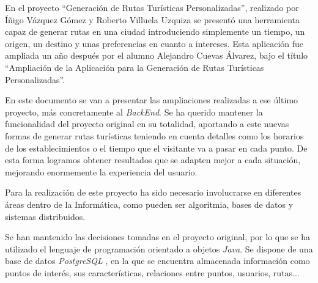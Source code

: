 
En el proyecto ``Generación de Rutas Turísticas Personalizadas'', realizado por Íñigo Vázquez Gómez y Roberto Villuela Uzquiza \cite{grpV1} se presentó una herramienta capaz de generar rutas en una ciudad introduciendo simplemente un tiempo, un origen, un destino y unas preferencias en cuanto a intereses.
Esta aplicación fue ampliada un año después por el alumno Alejandro Cuevas Álvarez, bajo el título ``Ampliación de la Aplicación para la Generación de Rutas Turísticas Personalizadas''\cite{grpV2}.

En este documento se van a presentar las ampliaciones realizadas a ese último proyecto, más concretamente al \textit{BackEnd}. Se ha querido mantener la funcionalidad del proyecto original en su totalidad, aportando a este nuevas formas de generar rutas turísticas teniendo en cuenta detalles como los horarios de los establecimientos o el tiempo que el visitante va a pasar en cada punto. De esta forma logramos obtener resultados que se adapten mejor a cada situación, mejorando enormemente la experiencia del usuario.

Para la realización de este proyecto ha sido necesario involucrarse en diferentes áreas dentro de la Informática, como pueden ser algoritmia, bases de datos y sistemas distribuidos.

Se han mantenido las decisiones tomadas en el proyecto original, por lo que se ha utilizado el lenguaje de programación orientado a objetos \textit{Java}.
Se dispone de una base de datos \textit{PostgreSQL} \cite{wiki:postgresql}, en la que se encuentra almacenada información como puntos de interés, sus características, relaciones entre puntos, usuarios, rutas...
 